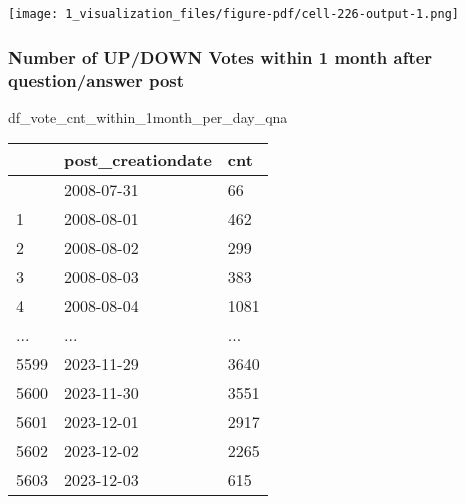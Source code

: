 \documentclass[
  letterpaper,
  DIV=11,
  numbers=noendperiod]{scrartcl}
\newenvironment{Shaded}{\begin{snugshade}}{\end{snugshade}}
\newcommand{\NormalTok}[1]{\textcolor[rgb]{0.00,0.23,0.31}{#1}}
\begin{document}
\texttt{[image: 1\_visualization\_files/figure-pdf/cell-226-output-1.png]}

\subsubsection{Number of UP/DOWN Votes within 1 month after
question/answer
post}\label{number-of-updown-votes-within-1-month-after-questionanswer-post}

\begin{Shaded}
\begin{Highlighting}[]
\NormalTok{df\_vote\_cnt\_within\_1month\_per\_day\_qna}
\end{Highlighting}
\end{Shaded}

\begin{longtable}[]{@{}lll@{}}
\toprule\noalign{}
& post\_creationdate & cnt \\
\midrule\noalign{}
\endhead
\bottomrule\noalign{}
\endlastfoot
0 & 2008-07-31 & 66 \\
1 & 2008-08-01 & 462 \\
2 & 2008-08-02 & 299 \\
3 & 2008-08-03 & 383 \\
4 & 2008-08-04 & 1081 \\
... & ... & ... \\
5599 & 2023-11-29 & 3640 \\
5600 & 2023-11-30 & 3551 \\
5601 & 2023-12-01 & 2917 \\
5602 & 2023-12-02 & 2265 \\
5603 & 2023-12-03 & 615 \\
\end{longtable}
\end{document}
